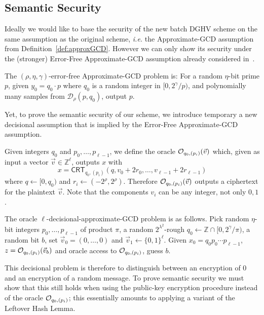 \documentclass[11pt]{llncs}
\newcommand{\ie}{\textsl{i.e.}\xspace}
\newcommand{\Z}{{\mathbb Z}}
\newcommand*{\crt}{\ensuremath{\mathsf{CRT}}}
\begin{document}
\subsection{Semantic Security}\label{sec:semantic-security}

Ideally we would like to base the security of the new batch DGHV scheme on
the same assumption as the original scheme, \ie the
Approximate-GCD assumption from Definition~\ref{def:approxGCD}.
However we can only show its security under the
(stronger) Error-Free Approximate-GCD assumption already considered in~\cite{CMNT2011,CNT2012}.
\begin{definition} 
The $(\rho, \eta,{\gamma})$-error-free Appro\-xi\-ma\-te-GCD pro\-blem
is: For a random $\eta$-bit prime $p$, given $y_0=q_0\cdot p$
where $q_0$ is a random integer in $[0,
  2^{\gamma}/p)$, and polynomially many samples from $\mathcal
  D_\rho(p,q_0)$, output $p$. 
\end{definition} 

Yet, to prove the semantic security of our scheme, 
we introduce temporary a new decisional assumption that is implied by the 
Error-Free Approximate-GCD assumption.

Given integers $q_0$ and $p_0,\ldots,p_{\ell-1}$, we define the oracle
${\cal O}_{q_0,(p_i)}(\vec{v})$ which, given as input a vector $\vec{v} \in {\mathbb
  Z}^\ell$, outputs $x$ with
$$ x = \crt_{q_0,(p_i)}(q,v_0+2r_0,\ldots,v_{\ell-1}+2r_{\ell-1})$$
where $q \leftarrow [0,q_0)$ and $r_i \leftarrow
    (-2^\rho,2^\rho)$. Therefore ${\cal O}_{q_0,(p_i)}(\vec{v})$
    outputs a ciphertext for the plaintext $\vec{v}$. Note that the
    components $v_i$ can be any integer, not only $0,1$.

\begin{definition} The
  oracle $\ell$-decisional-approximate-GCD problem is as
  follows. Pick random $\eta$-bit 
  integers $p_0,\ldots,p_{\ell-1}$ of product $\pi$, a random
  $2^{\lambda^2}$-rough $q_0 \leftarrow \Z \cap  
  [0,2^{\gamma}/\pi)$, a random bit $b$, set $\vec{v}_0=
  (0,\ldots,0)$
and $\vec{v}_1\leftarrow
  \{0,1\}^\ell$. Given  $x_0=q_0p_0\cdots p_{\ell-1}$, $z={\cal O}_{q_0,(p_i)}(\vec{v}_b)$ and oracle access to ${\cal
    O}_{q_0,(p_i)}$, guess $b$.
\end{definition}
 
This decisional
problem is therefore to distinguish between an encryption of $0$ and
an encryption of a random message. To prove semantic security 
we must show that this  still holds when using the public-key
encryption procedure instead of the oracle ${\cal 
    O}_{q_0,(p_i)}$; this essentially amounts to applying a variant
                    of the Leftover Hash Lemma.
\end{document}
